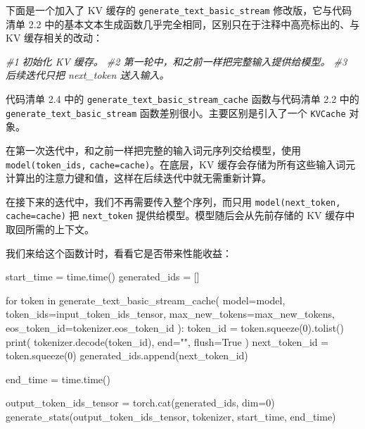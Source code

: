 下面是一个加入了 KV 缓存的 \texttt{generate\_text\_basic\_stream} 修改版，它与代码清单 2.2 中的基本文本生成函数几乎完全相同，区别只在于注释中高亮标出的、与 KV 缓存相关的改动：

{\noindent\small\textit{\#1 初始化 KV 缓存。 \newline \#2 第一轮中，和之前一样把完整输入提供给模型。 \newline \#3 后续迭代只把 next\_token 送入输入。}\par}

代码清单 2.4 中的 \texttt{generate\_text\_basic\_stream\_cache} 函数与代码清单 2.2 中的 \texttt{generate\_text\_basic\_stream} 函数差别很小。主要区别是引入了一个 \texttt{KVCache} 对象。

在第一次迭代中，和之前一样把完整的输入词元序列交给模型，使用 \texttt{model(token\_ids,} \texttt{cache=cache)}。在底层，KV 缓存会存储为所有这些输入词元计算出的注意力键和值，这样在后续迭代中就无需重新计算。

在接下来的迭代中，我们不再需要传入整个序列，而只用 \texttt{model(next\_token,} \texttt{cache=cache)} 把 \texttt{next\_token} 提供给模型。模型随后会从先前存储的 KV 缓存中取回所需的上下文。

我们来给这个函数计时，看看它是否带来性能收益：

\begin{codebox}
start_time = time.time()
generated_ids = []

for token in generate_text_basic_stream_cache(
    model=model,
    token_ids=input_token_ids_tensor,
    max_new_tokens=max_new_tokens,
    eos_token_id=tokenizer.eos_token_id
):
    token_id = token.squeeze(0).tolist()
    print(
        tokenizer.decode(token_id),
        end="",
        flush=True
    )
    next_token_id = token.squeeze(0)
    generated_ids.append(next_token_id)

end_time = time.time()

output_token_ids_tensor = torch.cat(generated_ids, dim=0)
generate_stats(output_token_ids_tensor, tokenizer, start_time, end_time)
\end{codebox}

